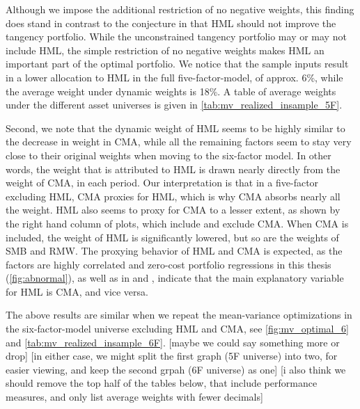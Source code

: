 Although we impose the additional restriction of no negative weights, this finding does stand in contrast to the conjecture in \textcite{FF2015} that HML should not improve the tangency portfolio. While the unconstrained tangency portfolio may or may not include HML, the simple restriction of no negative weights makes HML an important part of the optimal portfolio. We notice that the sample inputs result in a lower allocation to HML in the full five-factor-model, of approx. 6\%, while the average weight under dynamic weights is 18\%. A table of average weights under the different asset universes is given in \autoref{tab:mv_realized_insample_5F}.

Second, we note that the dynamic weight of HML seems to be highly similar to the decrease in weight in CMA, while all the remaining factors seem to stay very close to their original weights when moving to the six-factor model. In other words, the weight that is attributed to HML is drawn nearly directly from the weight of CMA, in each period. Our interpretation is that in a five-factor excluding HML, CMA proxies for HML, which is why CMA absorbs nearly all the weight. HML also seems to proxy for CMA to a lesser extent, as shown by the right hand column of plots, which include and exclude CMA. When CMA is included, the weight of HML is significantly lowered, but so are the weights of SMB and RMW. The proxying behavior of HML and CMA is expected, as the factors are highly correlated and zero-cost portfolio regressions in this thesis (\autoref{fig:abnormal}), as well as in \textcite{FF2015} and \textcite{Asness2015}, indicate that the main explanatory variable for HML is CMA, and vice versa.

The above results are similar when we repeat the mean-variance optimizations in the six-factor-model universe excluding HML and CMA, see \autoref{fig:mv_optimal_6} and \autoref{tab:mv_realized_insample_6F}. [maybe we could say something more or drop] [in either case, we might split the first graph (5F universe) into two, for easier viewing, and keep the second grpah (6F universe) as one] [i also think we should remove the top half of the tables below, that include performance measures, and only list average weights with fewer decimals]

